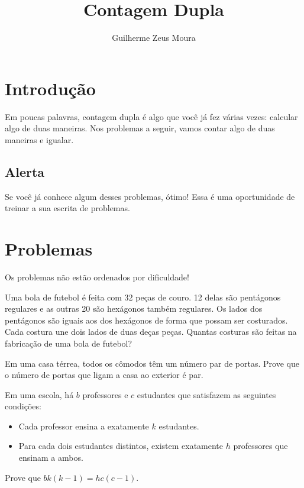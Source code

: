 \documentclass[10pt, a4paper]{article}
\title{Contagem Dupla}
\author{Guilherme Zeus Moura}
\begin{document}
	
	\zeustitle

	\section{Introdução}

	Em poucas palavras, contagem dupla é algo que você já fez várias vezes: calcular algo de duas maneiras. Nos problemas a seguir, vamos contar algo de duas maneiras e igualar.

	\subsection{Alerta}

	Se você já conhece algum desses problemas, ótimo! Essa é uma oportunidade de treinar a sua escrita de problemas.

	\section{Problemas}

	Os problemas não estão ordenados por dificuldade!

	\begin{prob} %
		Uma bola de futebol é feita com 32 peças de couro. 12 delas são pentágonos regulares e as outras 20 são hexágonos também regulares. Os lados dos pentágonos são iguais aos dos hexágonos de forma que possam ser costurados. Cada costura une dois lados de duas deças peças. Quantas costuras são feitas na fabricação de uma bola de futebol?
	\end{prob}

	\begin{prob} %
		Em uma casa térrea, todos os cômodos têm um número par de portas. Prove que o número de portas que ligam a casa ao exterior é par.	
	\end{prob}

	\begin{prob} %
		Em uma escola, há $b$ professores e $c$ estudantes que satisfazem as seguintes condições:
		
		\begin{itemize}
			\item Cada professor ensina a exatamente $k$ estudantes.
			\item Para cada dois estudantes distintos, existem exatamente $h$ professores que ensinam a ambos.
		\end{itemize}

		Prove que $bk(k-1) = hc(c-1)$.
	\end{prob}
\end{document}
